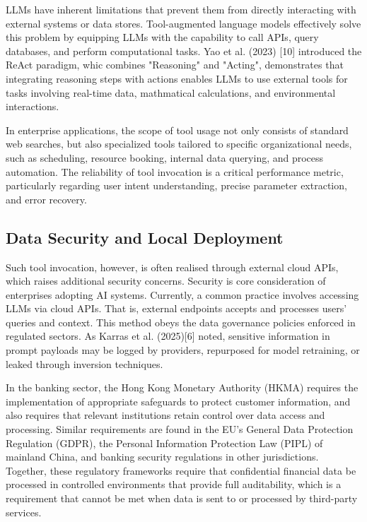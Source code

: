 LLMs have inherent limitations that prevent them from directly interacting with external systems or data stores. Tool-augmented language models effectively solve this problem by equipping LLMs with the capability to call APIs, query databases, and perform computational tasks. Yao et al. (2023) [10] introduced the ReAct paradigm, whic combines "Reasoning" and "Acting", demonstrates that integrating reasoning steps with actions enables LLMs to use external tools for tasks involving real-time data, mathmatical calculations, and environmental interactions.

In enterprise applications, the scope of tool usage not only consists of standard web searches, but also specialized tools tailored to specific organizational needs, such as scheduling, resource booking, internal data querying, and process automation. The reliability of tool invocation is a critical performance metric, particularly regarding user intent understanding, precise parameter extraction, and error recovery.

\subsection{Data Security and Local Deployment}

Such tool invocation, however, is often realised through external cloud APIs, which raises additional security concerns. Security is core consideration of enterprises adopting AI systems. Currently, a common practice involves accessing LLMs via cloud APIs. That is, external endpoints accepts and processes users' queries and context. This method obeys the data governance policies enforced in regulated sectors. As Karras et al. (2025)[6] noted, sensitive information in prompt payloads may be logged by providers, repurposed for model retraining, or leaked through inversion techniques. 

In the banking sector, the Hong Kong Monetary Authority (HKMA) requires the implementation of appropriate safeguards to protect customer information, and also requires that relevant institutions retain control over data access and processing. Similar requirements are found in the EU’s General Data Protection Regulation (GDPR), the Personal Information Protection Law (PIPL) of mainland China, and banking security regulations in other jurisdictions. Together, these regulatory frameworks require that confidential financial data be processed in controlled environments that provide full auditability, which is a requirement that cannot be met when data is sent to or processed by third-party services.

